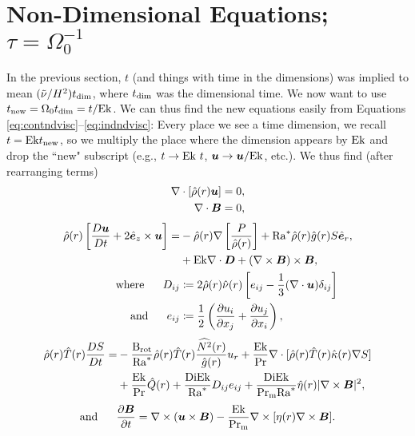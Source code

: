 \documentclass[12pt]{article}
\numberwithin{equation}{section}
\newcommand{\rhond}{\hat{\rho}}
\newcommand{\tmpnd}{\hat{T}}
\newcommand{\gnd}{\hat{g}}
\newcommand{\nund}{\hat{\nu}}
\newcommand{\kappand}{\hat{\kappa}}
\newcommand{\etand}{\hat{\eta}}
\begin{document}
\section{Non-Dimensional Equations; $\tau=\Omega_0^{-1}$}
In the previous section, $t$ (and things with time in the dimensions) was implied to mean $(\tilde{\nu}/H^2) t_{\rm{dim}}$, where $t_{\rm{dim}}$ was the dimensional time. We now want to use $t_{\rm{new}}= \Omega_0t_{\rm{dim}} = t/{\rm{Ek}}$. We can thus find the new equations easily from Equations \eqref{eq:contndvisc}--\eqref{eq:indndvisc}: Every place we see a time dimension, we recall $t={\rm{Ek}} t_{\rm{new}}$, so we multiply the place where the dimension appears by ${\rm{Ek}}$ and drop the ``new" subscript (e.g., $t\rightarrow {\rm{Ek}}\ t$, $\bm{u}\rightarrow\bm{u}/{\rm{Ek}}$, etc.).  We thus find (after rearranging terms)
\begin{align}
	\Div[\rhond\ofr\vecu] &= 0\label{eq:contndrot},\\
	\Div \vecb &= 0,
\end{align}
\begin{subequations}\label{eq:momndrot}
	\begin{align}
		\rhond\ofr\left[\matderiv{\vecu} + 2\ez\times\vecu\right] = &-\rhond\ofr\nabla\left[ \frac{P}{\rhond\ofr} \right] + \ramod \rhond\ofr\gnd\ofr S\er, \nonumber\\
		&+ \ek \Div\bm{D} +(\curl\vecb)\times\vecb,\\
		\where D_{ij} &\define 2\rhond\ofr\nund\ofr \left[e_{ij} - \frac{1}{3}(\Div\vecu) \delta_{ij} \right]\\
		\andd e_{ij} &\define \frac{1}{2}\left(\pderiv{u_i}{x_j} + \pderiv{u_j}{x_i} \right),
	\end{align}
\end{subequations}
\begin{align}\label{eq:enndrot}
	\rhond\ofr\tmpnd\ofr \matderiv{S} = &- \frac{\brot}{\ramod} \rhond\ofr\tmpnd\ofr \frac{\widehat{N^2}\ofr}{\hat{g}\ofr} \ur + \frac{\ek}{\pr} \Div[\rhond\ofr \tmpnd\ofr \kappand\ofr \nabla S] \nonumber \\
	&+ \frac{\ek}{\pr} \hat{Q}(r) + \frac{\di\ek}{\ramod} D_{ij}e_{ij} + \frac{\di\ek}{\prm\ramod} \etand\ofr|\curl\vecb|^2,
\end{align}
\begin{align}\label{eq:indndrot}
	\text{and}\ \ \ \ \  \frac{\partial\bm{B}}{\partial t} = \nabla\times(\bm{u}\times\bm{B}) - \frac{{\rm{Ek}}}{{\rm{Pr_m}}} \nabla\times[\eta(r)\nabla\times\bm{B}].
\end{align}	
\end{document}
